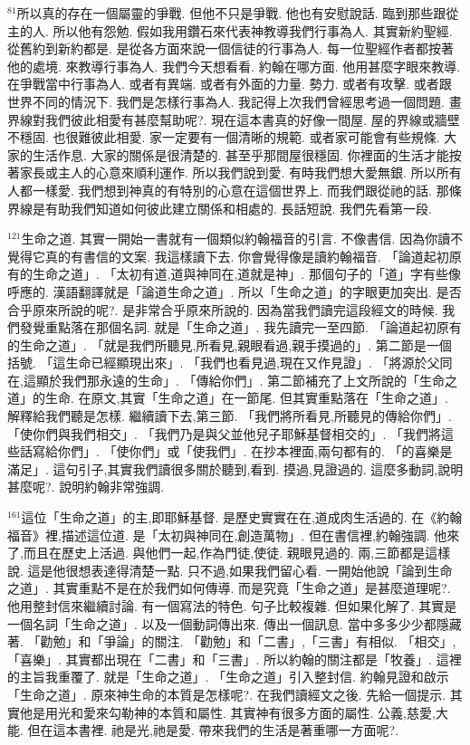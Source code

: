 \documentclass{book}
\begin{document}
$^{81}$所以真的存在一個屬靈的爭戰.
但他不只是爭戰.
他也有安慰說話.
臨到那些跟從主的人.
所以他有怨勉.
假如我用鑽石來代表神教導我們行事為人.
其實新約聖經.
從舊約到新約都是.
是從各方面來說一個信徒的行事為人.
每一位聖經作者都按著他的處境.
來教導行事為人.
我們今天想看看.
約翰在哪方面.
他用甚麼字眼來教導.
在爭戰當中行事為人.
或者有異端.
或者有外面的力量.
勢力.
或者有攻擊.
或者跟世界不同的情況下.
我們是怎樣行事為人.
我記得上次我們曾經思考過一個問題.
畫界線對我們彼此相愛有甚麼幫助呢?.
現在這本書真的好像一間屋.
屋的界線或牆壁不穩固.
也很難彼此相愛.
家一定要有一個清晰的規範.
或者家可能會有些規條.
大家的生活作息.
大家的關係是很清楚的.
甚至乎那間屋很穩固.
你裡面的生活才能按著家長或主人的心意來順利運作.
所以我們說到愛.
有時我們想大愛無銀.
所以所有人都一樣愛.
我們想到神真的有特別的心意在這個世界上.
而我們跟從祂的話.
那條界線是有助我們知道如何彼此建立關係和相處的.
長話短說.
我們先看第一段.

$^{121}$生命之道.
其實一開始一書就有一個類似約翰福音的引言.
不像書信.
因為你讀不覺得它真的有書信的文案.
我這樣讀下去.
你會覺得像是讀約翰福音.
「論道起初原有的生命之道」.
「太初有道,道與神同在,道就是神」.
那個句子的「道」字有些像呼應的.
漢語翻譯就是「論道生命之道」.
所以「生命之道」的字眼更加突出.
是否合乎原來所說的呢?.
是非常合乎原來所說的.
因為當我們讀完這段經文的時候.
我們發覺重點落在那個名詞.
就是「生命之道」.
我先讀完一至四節.
「論道起初原有的生命之道」.
「就是我們所聽見,所看見,親眼看過,親手摸過的」.
第二節是一個括號.
「這生命已經顯現出來」.
「我們也看見過,現在又作見證」.
「將源於父同在,這顯於我們那永遠的生命」.
「傳給你們」.
第二節補充了上文所說的「生命之道」的生命.
在原文,其實「生命之道」在一節尾.
但其實重點落在「生命之道」.
解釋給我們聽是怎樣.
繼續讀下去,第三節.
「我們將所看見,所聽見的傳給你們」.
「使你們與我們相交」.
「我們乃是與父並他兒子耶穌基督相交的」.
「我們將這些話寫給你們」.
「使你們」或「使我們」.
在抄本裡面,兩句都有的.
「的喜樂是滿足」.
這句引子,其實我們讀很多關於聽到,看到.
摸過,見證過的.
這麼多動詞,說明甚麼呢?.
說明約翰非常強調.

$^{161}$這位「生命之道」的主,即耶穌基督.
是歷史實實在在,道成肉生活過的.
在《約翰福音》裡,描述這位道.
是「太初與神同在,創造萬物」.
但在書信裡,約翰強調.
他來了,而且在歷史上活過.
與他們一起,作為門徒,使徒.
親眼見過的.
兩,三節都是這樣說.
這是他很想表達得清楚一點.
只不過,如果我們留心看.
一開始他說「論到生命之道」.
其實重點不是在於我們如何傳導.
而是究竟「生命之道」是甚麼道理呢?.
他用整封信來繼續討論.
有一個寫法的特色.
句子比較複雜.
但如果化解了.
其實是一個名詞「生命之道」.
以及一個動詞傳出來.
傳出一個訊息.
當中多多少少都隱藏著.
「勸勉」和「爭論」的關注.
「勸勉」和「二書」,「三書」有相似.
「相交」,「喜樂」.
其實都出現在「二書」和「三書」.
所以約翰的關注都是「牧養」.
這裡的主旨我重覆了.
就是「生命之道」.
「生命之道」引入整封信.
約翰見證和啟示「生命之道」.
原來神生命的本質是怎樣呢?.
在我們讀經文之後.
先給一個提示.
其實他是用光和愛來勾勒神的本質和屬性.
其實神有很多方面的屬性.
公義,慈愛,大能.
但在這本書裡.
祂是光,祂是愛.
帶來我們的生活是著重哪一方面呢?.
\end{document}
